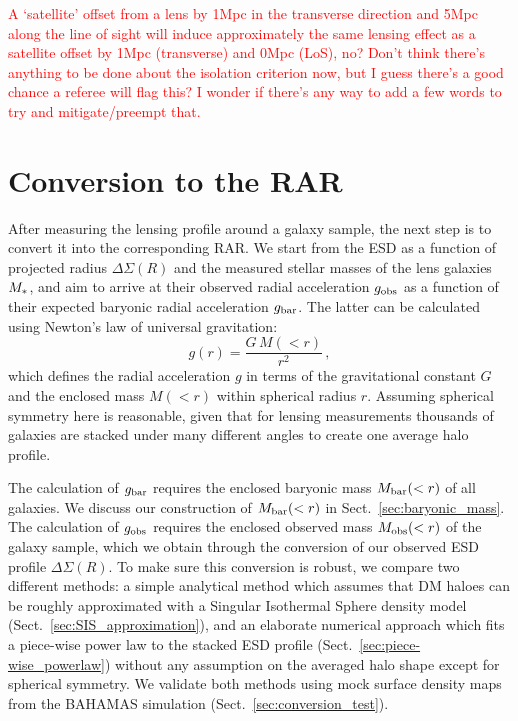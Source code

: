 \documentclass[usenatbib]{mnras}
\newcommand{\un}[1]{_{\rm #1}}
\begin{document}
\textcolor{red}{A `satellite' offset from a lens by 1Mpc in the transverse direction and 5Mpc along the line of sight will induce approximately the same lensing effect as a satellite offset by 1Mpc (transverse) and 0Mpc (LoS), no? Don't think there's anything to be done about the isolation criterion now, but I guess there's a good chance a referee will flag this? I wonder if there's any way to add a few words to try and mitigate/preempt that.}

\section{Conversion to the RAR}
\label{sec:conversion}

After measuring the lensing profile around a galaxy sample, the next step is to convert it into the corresponding RAR. We start from the ESD as a function of projected radius $\Delta\Sigma(R)$ and the measured stellar masses of the lens galaxies $M\un{*}$, and aim to arrive at their observed radial acceleration $g\un{obs}$ as a function of their expected baryonic radial acceleration $g\un{bar}$. The latter can be calculated using Newton's law of universal gravitation:
\begin{equation}\label{eq:grav}
g(r) = \frac{G \, M(<r)}{r^2} \, ,
\end{equation}
which defines the radial acceleration $g$ in terms of the gravitational constant $G$ and the enclosed mass $M(<r)$ within spherical radius $r$. Assuming spherical symmetry here is reasonable, given that for lensing measurements thousands of galaxies are stacked under many different angles to create one average halo profile. 

The calculation of $g\un{bar}$ requires the enclosed baryonic mass $M\un{bar}(<r)$ of all galaxies. We discuss our construction of $M\un{bar}(<r)$ in Sect.~\ref{sec:baryonic_mass}. The calculation of $g\un{obs}$ requires the enclosed observed mass $M\un{obs}(<r)$ of the galaxy sample, which we obtain through the conversion of our observed ESD profile \mbox{$\Delta\Sigma(R)$}. To make sure this conversion is robust, we compare two different methods: a simple analytical method which assumes that DM haloes can be roughly approximated with a Singular Isothermal Sphere density model (Sect.~\ref{sec:SIS_approximation}), and an elaborate numerical approach which fits a piece-wise power law to the stacked ESD profile (Sect.~\ref{sec:piece-wise_powerlaw}) without any assumption on the averaged halo shape except for spherical symmetry. We validate both methods using mock surface density maps from the BAHAMAS simulation (Sect.~\ref{sec:conversion_test}).
\end{document}
